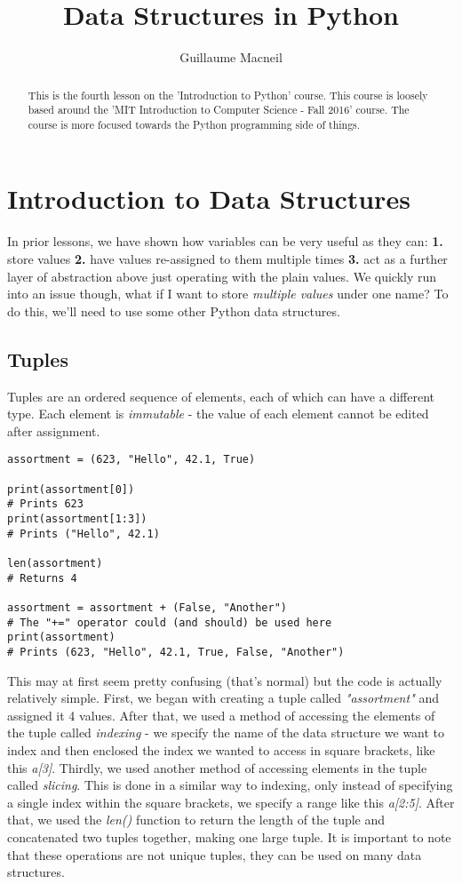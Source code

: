 \documentclass{article}
\title{Data Structures in Python}
\author{Guillaume Macneil}
\begin{document}
\maketitle

\begin{abstract}
This is the fourth lesson on the 'Introduction to Python' course. This course is loosely based around the 'MIT Introduction to Computer Science - Fall 2016' course. The course is more focused towards the Python programming side of things.
\end{abstract}

\section{Introduction to Data Structures}
In prior lessons, we have shown how variables can be very useful as they can: \textbf{1.} store values \textbf{2.} have values re-assigned to them multiple times \textbf{3.} act as a further layer of abstraction above just operating with the plain values. We quickly run into an issue though, what if I want to store \textit{multiple values} under one name? To do this, we'll need to use some other Python data structures.

\subsection{Tuples}
Tuples are an ordered sequence of elements, each of which can have a different type. Each element is \textit{immutable} - the value of each element cannot be edited after assignment.

\begin{verbatim}
assortment = (623, "Hello", 42.1, True)

print(assortment[0])
# Prints 623
print(assortment[1:3])
# Prints ("Hello", 42.1)

len(assortment)
# Returns 4

assortment = assortment + (False, "Another")
# The "+=" operator could (and should) be used here
print(assortment)
# Prints (623, "Hello", 42.1, True, False, "Another")
\end{verbatim}

This may at first seem pretty confusing (that's normal) but the code is actually relatively simple. First, we began with creating a tuple called \textit{"assortment"} and assigned it 4 values. After that, we used a method of accessing the elements of the tuple called \textit{indexing} - we specify the name of the data structure we want to index and then enclosed the index we wanted to access in square brackets, like this \textit{a[3]}. Thirdly, we used another method of accessing elements in the tuple called \textit{slicing}. This is done in a similar way to indexing, only instead of specifying a single index within the square brackets, we specify a range like this \textit{a[2:5]}. After that, we used the \textit{len()} function to return the length of the tuple and concatenated two tuples together, making one large tuple. It is important to note that these operations are not unique tuples, they can be used on many data structures.
\end{document}
